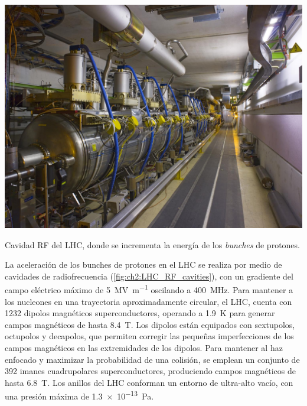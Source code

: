 \begin{marginfigure}
    \includegraphics[width=\linewidth]{Assets/Images/LHC_RF_cavities.jpg}
    \caption{Cavidad RF del LHC, donde se incrementa la energía de los \textit{bunches} de protones.}
    \label{fig:ch2:LHC_RF_cavities}
\end{marginfigure}

La aceleración de los bunches de protones en el LHC se realiza por medio de cavidades de radiofrecuencia (\cref{fig:ch2:LHC_RF_cavities}), con un gradiente del campo eléctrico máximo de \SI{5}{\mega\volt\per\meter} oscilando a \SI{400}{\mega\hertz}. Para mantener a los nucleones en una trayectoria aproximadamente circular, el LHC, cuenta con 1232 dipolos magnéticos superconductores, operando a \SI{1.9}{\kelvin} para generar campos magnéticos de hasta \SI{8.4}{\tesla}. Los dipolos están equipados con sextupolos, octupolos y decapolos, que permiten corregir las pequeñas imperfecciones de los campos magnéticos en las extremidades de los dipolos. Para mantener al haz enfocado y maximizar la probabilidad de una colisión, se emplean un conjunto de 392 imanes cuadrupolares superconductores, produciendo campos magnéticos de hasta \SI{6.8}{\tesla}. Los anillos del LHC conforman un entorno de ultra-alto vacío, con una presión máxima de \SI{1.3e-13}{\pascal}.

